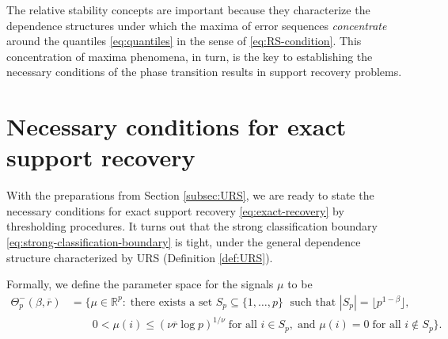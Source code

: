 The relative stability concepts are important because they characterize the dependence structures under which the maxima of error sequences {\em concentrate} around the quantiles \eqref{eq:quantiles} in the sense of \eqref{eq:RS-condition}.
This concentration of maxima phenomena, in turn, is the key to establishing the necessary conditions of the phase transition results in support recovery problems.


\section{Necessary conditions for exact support recovery}
\label{subsec:necessary}

With the preparations from Section \ref{subsec:URS}, we are ready to state the necessary conditions for exact support recovery \eqref{eq:exact-recovery} by thresholding procedures. 
It turns out that the strong classification boundary \eqref{eq:strong-classification-boundary} is tight, under the general dependence structure characterized by URS (Definition \ref{def:URS}).

Formally, we define the parameter space for the signals $\mu$ to be
\begin{align} \label{eq:minimax-signal-config-under}
    \Theta_p^-(\beta, \overline{r}) &= \{\mu\in\mathbb{R}^p:\;\text{there exists a set }S_p\subseteq\{1,\ldots,p\}\;\text{ such that }|S_p|=\lfloor p^{1-\beta}\rfloor, \nonumber \\
    &\quad\quad0<\mu(i)\le(\nu\overline{r}\log{p})^{1/\nu}\;\text{for all }i\in S_p,\;\text{and }\mu(i)=0\;\text{for all }i\not\in S_p\}.
\end{align}


